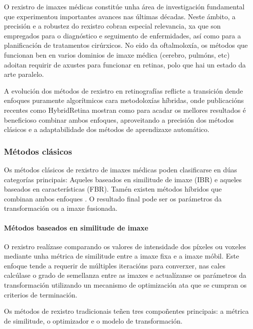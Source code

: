 O rexistro de imaxes médicas constitúe unha área de investigación fundamental que experimentou importantes avances nas últimas décadas. Neste ámbito, a precisión e a robustez do rexistro cobran especial relevancia, xa que son empregados para o diagnóstico e seguimento de enfermidades, así como para a planificación de tratamentos cirúrxicos.
No eido da oftalmoloxía, os métodos que funcionan ben en varios dominios de imaxe médica (cerebro, pulmóns, etc) adoitan requirir de axustes para funcionar en retinas, polo que hai un estado da arte paralelo. 

A evolución dos métodos de rexistro en retinografías reflicte a transición dende enfoques puramente algorítmicos cara metodoloxías híbridas, onde publicacións recentes como HybridRetina \cite{liu2024progressiveretinalimageregistration}  mostran como para acadar os mellores resultados é beneficioso combinar ambos enfoques, aproveitando a precisión dos métodos clásicos e a adaptabilidade dos métodos de aprendizaxe automático.

\subsubsection{Métodos clásicos}
\label{subsubsec:Métodos clásicos}

Os métodos clásicos de rexistro de imaxes médicas poden clasificarse en dúas categorías principais:
Aqueles baseados en similitude de imaxe (\gls{IBR}) e aqueles baseados en características (\gls{FBR}).
Tamén existen métodos híbridos que combinan ambos enfoques \cite{integrateintfeat}.
O resultado final pode ser os parámetros da transformación ou a imaxe fusionada.

\paragraph{Métodos baseados en similitude de imaxe}
\label{par:Métodos baseados en similitude de imaxe}

O rexistro realízase comparando os valores de intensidade dos píxeles ou voxeles mediante unha métrica de similitude entre a imaxe fixa e a imaxe móbil.
Este enfoque tende a requerir de múltiples iteracións para converxer, nas cales calcúlase o grado de semellanza entre as imaxes e
actualízanse os parámetros da transformación utilizando un mecanismo de optimización ata que se cumpran os criterios de terminación.

Os métodos de rexistro tradicionais teñen tres compoñentes principais: a métrica de similitude, o optimizador e o modelo de transformación. 

